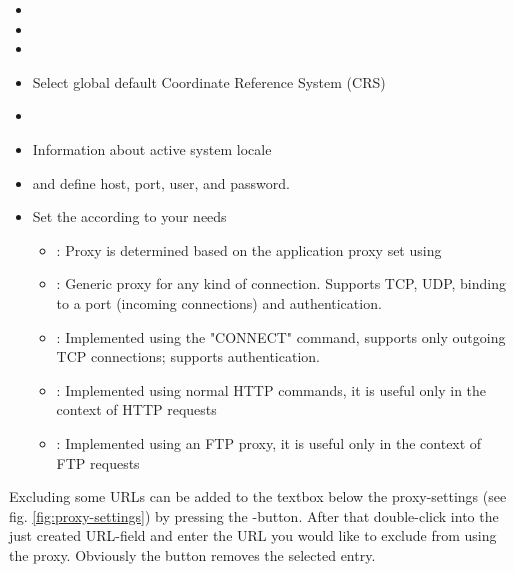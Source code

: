 
\begin{itemize}
\item {}
\item {}
\item {}
\item Select global default Coordinate Reference System (CRS)
\end{itemize}


\begin{itemize}
\item {}
\item Information about active system locale
\end{itemize}


\begin{itemize}
\item {} and define host, port, user, and password.
\item Set the  according to your needs
 \begin{itemize}
  \item {}: Proxy is determined based on the application proxy set using
  \item {}: Generic proxy for any kind of connection. Supports TCP, UDP, binding to a port (incoming connections) and authentication.
  \item {}: Implemented using the "CONNECT" command, supports only outgoing TCP connections; supports authentication.
  \item {}: Implemented using normal HTTP commands, it is useful only in the context of HTTP requests
  \item {}: Implemented using an FTP proxy, it is useful only in the context of FTP requests
 \end{itemize}
\end{itemize}

Excluding some URLs can be added to the textbox below the proxy-settings (see
fig. \ref{fig:proxy-settings}) by pressing the -button. After that
double-click into the just created URL-field and enter the URL you would like
to exclude from using the proxy. Obviously the button  removes the selected
entry.

